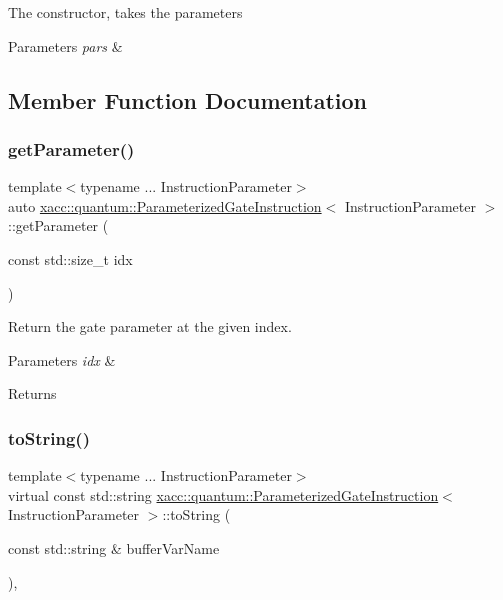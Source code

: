 The constructor, takes the parameters 
\begin{DoxyParams}{Parameters}
{\em pars} & \\
\hline
\end{DoxyParams}


\subsection{Member Function Documentation}
\mbox{\label{a01280_aab4a5f7e905928a96d6a1c3203ea42be}} 
\subsubsection{\texorpdfstring{get\+Parameter()}{getParameter()}}
{\footnotesize\ttfamily template$<$typename ... Instruction\+Parameter$>$ \\
auto \hyperlink{a01280}{xacc\+::quantum\+::\+Parameterized\+Gate\+Instruction}$<$ Instruction\+Parameter $>$\+::get\+Parameter (\begin{DoxyParamCaption}\item[{const std\+::size\+\_\+t}]{idx }\end{DoxyParamCaption})\hspace{0.3cm}{\ttfamily [inline]}}

Return the gate parameter at the given index.


\begin{DoxyParams}{Parameters}
{\em idx} & \\
\hline
\end{DoxyParams}
\begin{DoxyReturn}{Returns}

\end{DoxyReturn}
\mbox{\label{a01280_aaccc4a20d58d2ac5c31abe7e325b8f77}} 
\subsubsection{\texorpdfstring{to\+String()}{toString()}}
{\footnotesize\ttfamily template$<$typename ... Instruction\+Parameter$>$ \\
virtual const std\+::string \hyperlink{a01280}{xacc\+::quantum\+::\+Parameterized\+Gate\+Instruction}$<$ Instruction\+Parameter $>$\+::to\+String (\begin{DoxyParamCaption}\item[{const std\+::string \&}]{buffer\+Var\+Name }\end{DoxyParamCaption})\hspace{0.3cm}{\ttfamily [inline]}, {\ttfamily [virtual]}}

